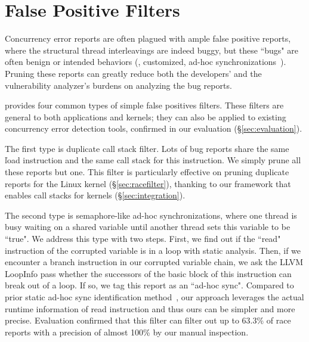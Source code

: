\section{False Positive Filters} \label{sec:impl}

Concurrency error reports are often plagued with ample false positive reports,
where the structural thread interleavings are indeed buggy, but these ``bugs"
are often benign or intended behaviors (\eg, customized, ad-hoc
synchronizations~\cite{syncfinder:osdi10}). Pruning these reports can
greatly reduce both the developers' and the \xxx vulnerability analyzer's
burdens on analyzing the bug reports.

\xxx provides four common types of simple false positives filters. These 
filters are general to both applications and kernels; they can also be applied 
to existing concurrency error detection tools, confirmed in our evaluation 
(\S\ref{sec:evaluation}).

The first type is duplicate call stack filter. Lots of bug reports share the 
same \v{load} instruction and the same call stack for this instruction. We 
simply prune all these reports but one. This filter is particularly effective 
on pruning duplicate reports for the Linux kernel (\S\ref{sec:racefilter}), 
thanking to our \xxx framework that enables call stacks for kernels 
(\S\ref{sec:integration}).

The second type is semaphore-like ad-hoc synchronizations, where one thread is
busy waiting on a shared variable until another thread sets this variable to be
``true". We address this type with two steps. First, we find out
if the ``read" instruction of the corrupted variable is in a loop with static
analysis. Then, if we encounter a branch instruction in our corrupted variable
chain, we ask the LLVM LoopInfo pass whether the successors of the basic block
of this instruction can break out of a loop. If so, we tag this report as
an ``ad-hoc sync". Compared to prior static ad-hoc sync identification
method~\cite{syncfinder:osdi10}, our approach leverages the actual runtime
information of read instruction and thus ours can be simpler and more precise.
Evaluation confirmed that this filter can filter out up to 63.3\% of race
reports with a precision of almost 100\% by our manual inspection.


